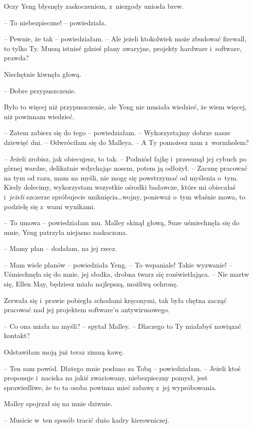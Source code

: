 \documentclass[oneside,polish,11pt,sfheadings]{mwbk}
\begin{document}
Oczy Yeng błysnęły zaskoczeniem, z~niezgody uniosła brew.

-- To niebezpieczne! -- powiedziała.

-- Pewnie, że tak -- powiedziałam. -- Ale jeżeli ktokolwiek może zbudować
firewall, to tylko Ty. Muszą istnieć gdzieś plany awaryjne, projekty
hardware i~software, prawda?

Niechętnie kiwnęła głową. 

-- Dobre przypuszczenie.

Było to więcej niż przypuszczenie, ale Yeng nie musiała wiedzieć, że
wiem więcej, niż powinnam wiedzieć.

-- Zatem zabierz się do tego -- powiedziałam. -- Wykorzystajmy dobrze nasze
dziewięć dni. -- Odwróciłam się do Malleya. -- A Ty pomożesz nam z~wormholem?

-- Jeżeli zrobisz, jak obiecujesz, to tak. -- Podniósł fajkę i~przesunął
jej cybuch po górnej wardze, delikatnie wdychając nosem, potem ją
odłożył. -- Zacznę pracować na tym od razu, mam na myśli, nie mogę się
powstrzymać od myślenia o~tym. Kiedy dolecimy, wykorzystam wszystkie
ośrodki badawcze, które mi obiecałaś i~\textit{jeżeli} szczerze
spróbujecie uniknięcia\ldots  wojny, ponieważ o~tym właśnie mowa, to
podzielę się z~wami wynikami.

-- To umowa -- powiedziałam mu. Malley skinął głową, Suze uśmiechnęła się
do mnie, Yeng patrzyła niejasno zaskoczona. 

-- Mamy plan -- dodałam, na jej rzecz.

-- Mam wiele planów -- powiedziała Yeng. -- To wspaniale! Takie wyzwanie! -- Uśmiechnęła się do mnie, jej słodka, drobna twarz się rozświetlająca. -- Nie martw się, Ellen May, będziesz miała najlepszą, możliwą ochronę.

Zerwała się i~prawie pobiegła schodami kręconymi, tak była chętna zacząć
pracować nad jej projektem software'u antywirusowego.

-- Co ona miała na myśli? -- spytał Malley. -- Dlaczego to Ty miałabyś
nawiązać kontakt?

Odstawiłam moją już teraz zimną kawę. 

-- Ten sam powód. Dlatego mnie
posłano za Tobą -- powiedziałam. -- Jeżeli ktoś proponuje i~naciska na
jakiś zwariowany, niebezpieczny pomysł, jest sprawiedliwe, że to ta
osoba powinna mieć zabawę z~jej wypróbowania.

Malley spojrzał się na mnie dziwnie. 

-- Musicie w~ten sposób tracić dużo
kadry kierowniczej.
\end{document}
